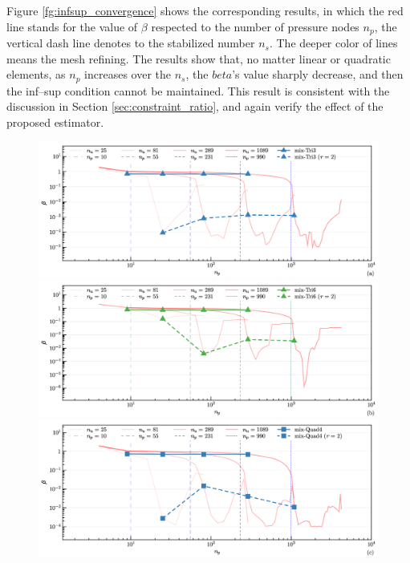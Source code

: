 Figure \ref{fg:infsup_convergence} shows the corresponding results, in which the red line stands for the value of $\beta$ respected to the number of pressure nodes $n_p$, the vertical dash line denotes to the stabilized number $n_s$.
The deeper color of lines means the mesh refining.
The results show that,
no matter linear or quadratic elements, as $n_p$ increases over the $n_s$, the $beta$'s value sharply decrease, and then the inf--sup condition cannot be maintained.
This result is consistent with the discussion in Section \ref{sec:constraint_ratio},
and again verify the effect of the proposed estimator.

\begin{figure}[H]
\centering
\begin{subcaptiongroup}
\includegraphics[width=\textwidth]{png/infsup_tri3.png}\label{a}
\includegraphics[width=\textwidth]{png/infsup_tri6.png}\label{b}
\includegraphics[width=\textwidth]{png/infsup_quad.png}\label{c}

\end{subcaptiongroup}
\end{figure}
